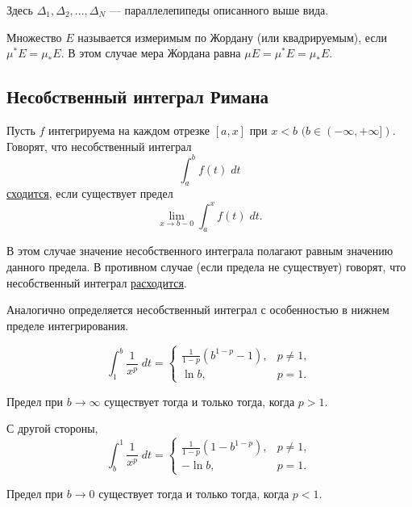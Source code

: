     Здесь $\Delta_1, \Delta_2, ..., \Delta_N$ — параллелепипеды описанного выше вида.
    
    \begin{definition}
    	Множество $E$ называется измеримым по Жордану (или
    	квадрируемым), если $\mu^{*}E = \mu_{*}E$. В этом случае мера Жордана равна $\mu E = \mu^{*}E = \mu_{*}E$.
    \end{definition}
    
    \subsection{Несобственный интеграл Римана}
    
    \begin{definition}
    	Пусть $f$ интегрируема на каждом отрезке $[a, x]$ при $x < b$ $(b \in (-\infty, +\infty])$. Говорят, что несобственный интеграл
    	\[ \int_a^b f(t) \; dt \]
    	\underline{сходится}, если существует предел
    	\[ \lim_{x \to b - 0} \int_a^x f(t) \; dt. \]
    
	    В этом случае значение несобственного интеграла полагают
	    равным значению данного предела. В противном случае (если
	    предела не существует) говорят, что несобственный интеграл
	    \underline{расходится}.
	    
	    Аналогично определяется несобственный интеграл с
	    особенностью в нижнем пределе интегрирования.
	\end{definition}
	
	\begin{example}
	    \begin{equation*}
	    	\int_1^b \frac{1}{x^p} \; dt = 
		    \begin{cases}
		    	\frac{1}{1 - p}(b^{1 - p} - 1), & p \neq 1, \\
		    	\ln{b}, & p = 1.
		    \end{cases}
	    \end{equation*}
	    
	    Предел при $b \rightarrow \infty$ существует тогда и только тогда, когда $p > 1$.
	    
	    С другой стороны,
	    \begin{equation*}
	    	\int_b^1 \frac{1}{x^p} \; dt = 
	    	\begin{cases}
	    		\frac{1}{1 - p}(1 - b^{1 - p}), & p \neq 1, \\
	    		-\ln{b}, & p = 1.
	    	\end{cases}
	    \end{equation*}
	    
	    Предел при $b \rightarrow 0$ существует тогда и только тогда, когда $p < 1$.
	\end{example}
	
